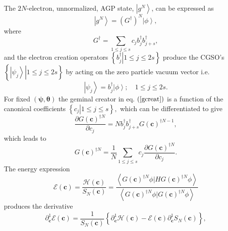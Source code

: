 \documentclass[aps,preprint]{revtex4}%
\begin{document}
The $2N$-electron, unnormalized, AGP state, $\left\vert g^{N}\right\rangle $,
can be expressed as
\begin{equation}
\left\vert g^{N}\right\rangle =\left(  G^{\dagger}\right)  ^{N}\left\vert
\phi\right\rangle ,
\end{equation}
where
\begin{equation}
G^{\dagger}=\sum_{1\leq j\leq s}c_{j}b_{j}^{\dagger}b_{j+s}^{\dagger},
\label{gcreat}%
\end{equation}
and the electron creation operators $\left\{  \left.  b_{j}^{\dagger
}\right\vert 1\leq j\leq2s\right\}  $ produce the CGSO's $\left\{  \left.
\left\vert \psi_{j}\right\rangle \right\vert 1\leq j\leq2s\right\}  $ by
acting on the zero particle vacuum vector i.e.
\begin{equation}
\left\vert \psi_{j}\right\rangle =b_{j}^{\dagger}\left\vert \phi\right\rangle
;\quad1\leq j\leq2s.
\end{equation}
For fixed $\left(  \mathbf{\mathbf{\psi},\theta}\right)  $ the geminal creator
in eq. $\left(  \ref{gcreat}\right)  $ is a function of the canonical
coefficients $\left\{  \left.  c_{j}\right\vert 1\leq j\leq s\right\}  ,$
which can be differentiated to give%
\begin{equation}
\frac{\partial G\left(  \mathbf{c}\right)  ^{\dagger N}}{\partial c_{j}%
}=Nb_{j}^{\dagger}b_{j+s}^{\dagger}G\left(  \mathbf{c}\right)  ^{\dagger N-1},
\end{equation}
which leads to
\begin{equation}
G\left(  \mathbf{c}\right)  ^{\dagger N}=\frac{1}{N}\sum_{1\leq j\leq s}%
c_{j}\frac{\partial G\left(  \mathbf{c}\right)  ^{\dagger N}}{\partial c_{j}}.
\label{euler}%
\end{equation}
The energy expression
\begin{equation}
\mathcal{E}\left(  \mathbf{c}\right)  =\frac{\mathcal{H}\left(  \mathbf{c}%
\right)  }{S_{N}\left(  \mathbf{c}\right)  }=\frac{\left\langle G\left(
\mathbf{c}\right)  ^{\dagger N}\phi|HG\left(  \mathbf{c}\right)  ^{\dagger
N}\phi\right\rangle }{\left\langle G\left(  \mathbf{c}\right)  ^{\dagger
N}\phi|G\left(  \mathbf{c}\right)  ^{\dagger N}\phi\right\rangle }%
\end{equation}
produces the derivative
\begin{equation}
\partial_{\mathbf{c}}^{1}\mathcal{E}\left(  \mathbf{c}\right)  =\frac{1}%
{S_{N}\left(  \mathbf{c}\right)  }\left\{  \partial_{\mathbf{c}}%
^{1}\mathcal{H}\left(  \mathbf{c}\right)  -\mathcal{E}\left(  \mathbf{c}%
\right)  \partial_{\mathbf{c}}^{1}S_{N}\left(  \mathbf{c}\right)  \right\}  ,
\end{equation}
\end{document}
